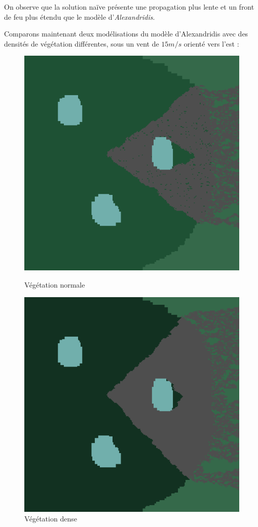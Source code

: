 \documentclass[12pt]{article}
\begin{document}
On observe que la solution naïve présente une propagation plus lente et un front de feu plus étendu que le modèle d'\textit{Alexandridis}.

Comparons maintenant deux modélisations du modèle d'Alexandridis avec des densités de végétation différentes, sous un vent de $15 m/s$ orienté vers l'est :

\begin{figure}[!ht]
    \centering
    \begin{minipage}{0.35\textwidth}
      \centering
      \includegraphics[width=.8\linewidth]{pictures/model2/land_200_wind_notdense.png}
      \caption{Végétation normale}\label{Fig:Data3}
    \end{minipage}\hfil
    \begin{minipage}{0.35\textwidth}
      \centering
      \includegraphics[width=.8\linewidth]{pictures/model2/land_200_wind_dense.png}
      \caption{Végétation dense}\label{Fig:Data4}
    \end{minipage}
 \end{figure}
\end{document}
